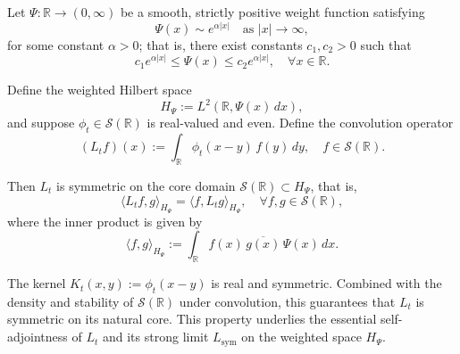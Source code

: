 \begin{proposition}
\label{prop:symmetry-Lt-Schwartz}
Let \( \Psi \colon \mathbb{R} \to (0,\infty) \) be a smooth, strictly positive weight function satisfying
\[
\Psi(x) \sim e^{\alpha|x|} \quad \text{as } |x| \to \infty,
\]
for some constant \( \alpha > 0 \); that is, there exist constants \( c_1, c_2 > 0 \) such that
\[
c_1 e^{\alpha |x|} \le \Psi(x) \le c_2 e^{\alpha |x|}, \quad \forall x \in \mathbb{R}.
\]

Define the weighted Hilbert space
\[
H_\Psi := L^2(\mathbb{R}, \Psi(x)\, dx),
\]
and suppose \( \phi_t \in \mathcal{S}(\mathbb{R}) \) is real-valued and even. Define the convolution operator
\[
(L_t f)(x) := \int_{\mathbb{R}} \phi_t(x - y)\, f(y)\, dy, \quad f \in \mathcal{S}(\mathbb{R}).
\]

Then \( L_t \) is symmetric on the core domain \( \mathcal{S}(\mathbb{R}) \subset H_\Psi \), that is,
\[
\langle L_t f, g \rangle_{H_\Psi} = \langle f, L_t g \rangle_{H_\Psi}, \quad \forall f, g \in \mathcal{S}(\mathbb{R}),
\]
where the inner product is given by
\[
\langle f, g \rangle_{H_\Psi} := \int_{\mathbb{R}} f(x)\, \overline{g(x)}\, \Psi(x)\, dx.
\]

\medskip
\noindent The kernel \( K_t(x,y) := \phi_t(x - y) \) is real and symmetric. Combined with the density and stability of \( \mathcal{S}(\mathbb{R}) \) under convolution, this guarantees that \( L_t \) is symmetric on its natural core. This property underlies the essential self-adjointness of \( L_t \) and its strong limit \( L_{\mathrm{sym}} \) on the weighted space \( H_\Psi \).
\end{proposition}
